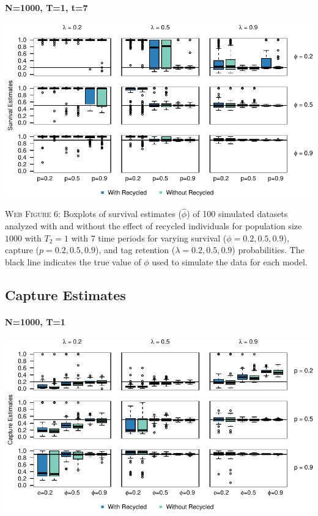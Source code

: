 \documentclass[]{article}
\let\oldparagraph\paragraph
\renewcommand{\paragraph}[1]{\oldparagraph{#1}\mbox{}}
\begin{document}
\paragraph{N=1000, T=1, t=7}\label{n1000-t1-t7}

\includegraphics{Appendix_files/figure-latex/figure6_survival_GJSTL6-1.pdf}

\textsc{Web Figure 6:} Boxplots of survival estimates (\(\hat{\phi}\))
of 100 simulated datasets analyzed with and without the effect of
recycled individuals for population size \(1000\) with \(T_2=1\) with 7
time periods for varying survival (\(\phi=0.2,0.5,0.9\)), capture
(\(p=0.2,0.5,0.9\)), and tag retention (\(\lambda=0.2,0.5,0.9\))
probabilities. The black line indicates the true value of \(\phi\) used
to simulate the data for each model.

\newpage

\subsection{Capture Estimates}\label{capture-estimates}

\paragraph{N=1000, T=1}\label{n1000-t1-1}

\includegraphics{Appendix_files/figure-latex/figure7_capture_GJSTL1-1.pdf}
\end{document}
